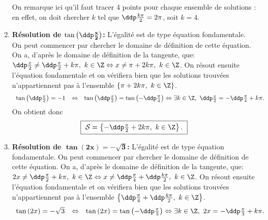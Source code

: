 \begin{correction}
\begin{enumerate}
On remarque ici qu'il faut tracer $4$ points pour chaque ensemble de solutions : en effet, on doit chercher $k$ tel que $\ddp \frac{k \pi}{2} = 2 \pi$, soit $k=4$.
\item \textbf{R\'esolution de $\mathbf{\tan{\left(\ddp\frac{x}{2}\right)}}$:}
L'\'egalit\'e est de type \'equation fondamentale. On peut commencer par chercher le domaine de d\'efinition de cette \'equation. On a, d'apr\`{e}s le domaine de d\'efinition de la tangente, que: $\ddp\frac{x}{2}\not= \ddp\frac{\pi}{2}+k\pi,\ k\in\Z\Leftrightarrow x\not= \pi+2k\pi,\ k\in\Z$. On r\'esout ensuite l'\'equation fondamentale et on v\'erifiera bien que les solutions trouv\'ees n'appartiennent pas \`{a} l'ensemble $\left\lbrace  \pi+2k\pi,\ k\in\Z \right\rbrace$. 
$$\begin{array}{lll}
\tan{\left(\ddp\frac{x}{2}\right)}=-1 &\Leftrightarrow & \tan{\left(\ddp\frac{x}{2}\right)}= \tan{\left(-\ddp\frac{\pi}{4}\right)}
\Leftrightarrow  \exists k\in\Z,\ \ddp\frac{x}{2}=-\ddp\frac{\pi}{4}+k\pi.\\
\end{array}$$
On obtient donc
\begin{equation*}
\fbox{
$\mathcal{S}=\left\lbrace -\ddp\frac{\pi}{2}+2k\pi,\ k\in\Z\right\rbrace.$
}
\end{equation*}
\item \textbf{R\'esolution de $\mathbf{ \tan{(2x)}=-\sqrt{3}}$:}
L'\'egalit\'e est de type \'equation fondamentale.
On peut commencer par chercher le domaine de d\'efinition de cette \'equation. On a, d'apr\`{e}s le domaine de d\'efinition de la tangente, que: $2x\not= \ddp\frac{\pi}{2}+k\pi,\ k\in\Z\Leftrightarrow x\not= \ddp\frac{\pi}{4}+\ddp\frac{k\pi}{2} ,\ k\in\Z$. On r\'esout ensuite l'\'equation fondamentale et on v\'erifiera bien que les solutions trouv\'ees n'appartiennent pas \`{a} l'ensemble $\left\lbrace \ddp\frac{\pi}{4}+\ddp\frac{k\pi}{2},\ k\in\Z \right\rbrace$. 
$$\begin{array}{lll}
\tan{(2x)}=-\sqrt{3} &\Leftrightarrow & \tan{(2x)}= \tan{\left(-\ddp\frac{\pi}{3}\right)}
\Leftrightarrow  \exists k\in\Z,\ 2x=-\ddp\frac{\pi}{3}+k\pi.
\end{array}$$
\begin{minipage}[c]{0.45\linewidth}

\end{minipage}
\end{enumerate}
\end{correction}
